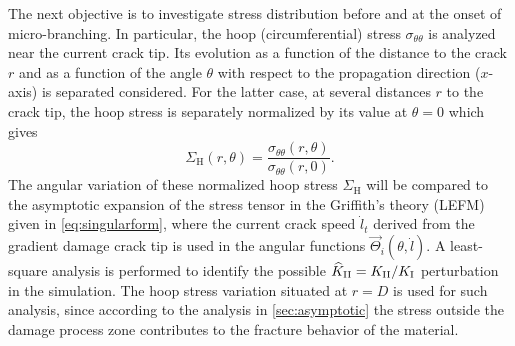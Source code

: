 The next objective is to investigate stress distribution before and at the onset of micro-branching. In particular, the hoop (circumferential) stress $\sigma_{\theta\theta}$ is analyzed near the current crack tip. Its evolution as a function of the distance to the crack $r$ and as a function of the angle $\theta$ with respect to the propagation direction ($x$-axis) is separated considered. For the latter case, at several distances $r$ to the crack tip, the hoop stress is separately normalized by its value at $\theta=0$ which gives
\[
\Sigma_\mathrm{H}(r,\theta)=\frac{\sigma_{\theta\theta}(r,\theta)}{\sigma_{\theta\theta}(r,0)}.
\]
The angular variation of these normalized hoop stress $\Sigma_\mathrm{H}$ will be compared to the asymptotic expansion of the stress tensor in the Griffith's theory (LEFM) given in \eqref{eq:singularform}, where the current crack speed $\dot{l}_t$ derived from the gradient damage crack tip is used in the angular functions $\vec{\Theta}_i(\theta,\dot{l})$. A least-square analysis is performed to identify the possible $\widehat{K}_\RNN{2}=K_\RNN{2}/K_\RNN{1}$ perturbation in the simulation. The hoop stress variation situated at $r=D$ is used for such analysis, since according to the analysis in \cref{sec:asymptotic} the stress outside the damage process zone contributes to the fracture behavior of the material.

